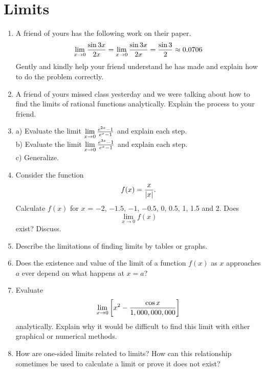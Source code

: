 \begin{enumerate}
\end{enumerate}\section{Limits} \begin{enumerate} 

\item  A friend of yours has the following work on their paper.
$$\mathop {\lim }\limits_{x \to 0} {{\sin 3x} \over {2x}} = \mathop {\lim }\limits_{x \to 0} {{\sin 3\rlap{--} x} \over {2\rlap{--} x}} = {{\sin 3} \over 2} \approx 0.0706$$
Gently and kindly help your friend understand he has made and explain how to do the problem correctly. 

\item  A friend of yours missed class yesterday and we were talking about how to find the limits of rational functions analytically.  Explain the process to your friend. 

\item  a)  Evaluate the limit $\mathop {\lim }\limits_{x \to 0} {{e^{2x}  - 1} \over {e^x  - 1}}$ and explain each step.  \\
b) Evaluate the limit $\mathop {\lim }\limits_{x \to 0} {{e^{3x}  - 1} \over {e^x  - 1}}$ and explain each step.  \\
c)	Generalize. 

\item  Consider the function $$f(x) = {x \over {\left| x \right|}}.$$  Calculate $f(x)$ for $x$ = $-2$, $-1.5$, $-1$, $-0.5$, 0, 0.5, 1, 1.5 and 2.  Does $$\mathop {\lim }\limits_{x \to 0} f(x)$$ exist? Discuss.  

\item  Describe the limitations of finding limits by tables or graphs. 

\item  Does the existence and value of the limit of a function $f(x)$ as $x$ approaches $a$ ever depend on what happens at $x = a$?  \cite{FWG} 

\item  Evaluate $$\mathop {\lim }\limits_{x \to 0} \left[ {x^2  - {{\cos x} \over {1,000,000,000}}} \right]$$ analytically.  Explain why it would be difficult to find this limit with either graphical or numerical methods. \cite{SBS} 

\item  How are one-sided limits related to limits?  How can this relationship sometimes be used to calculate a limit or prove it does not exist?  \cite{FWG} 


\end{enumerate}
